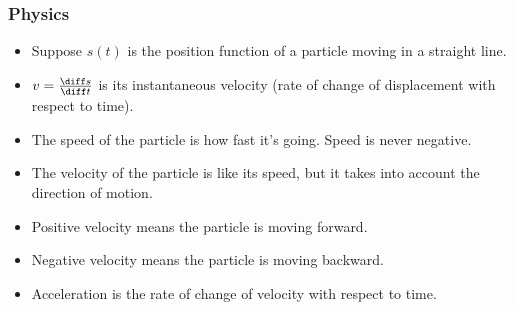 \begin{frame}
\frametitle{Physics}
\begin{itemize}
\item  Suppose $s(t)$ is the position function of a particle moving in a straight line.
\item  $v = \frac{\diff s}{\diff t}$ is its instantaneous velocity (rate of change of displacement with respect to time).
\item<2->  The speed of the particle is how fast it's going.  Speed is never negative.
\item<3->  The velocity of the particle is like its speed, but it takes into account the direction of motion.
\item<4->  Positive velocity means the particle is moving forward.
\item<5->  Negative velocity means the particle is moving backward.
\item<6->  Acceleration is the rate of change of velocity with respect to time.
\end{itemize}
\end{frame}
